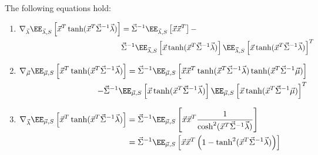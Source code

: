 \begin{lemma}\label{lem:derivatives}
The following equations hold:
\begin{enumerate}	
 \item
 $\begin{aligned}[t]
	\nabla_{\vec{\lambda}} \EE_{\vec{\lambda},S}\left[\vec{x}^T\tanh(\vec{x}^T\vec{\Sigma}^{-1}\vec{\lambda})\right]&=\vec{\Sigma}^{-1}\EE_{\vec{\lambda},S}\left[\vec{x}\vec{x}^T\right]-\\
	&\vec{\Sigma}^{-1}\EE_{\vec{\lambda},S}\left[\vec{x}\tanh(\vec{x}^T\vec{\Sigma}^{-1}\vec{\lambda})\right]\EE_{\vec{\lambda},S}\left[\vec{x}\tanh(\vec{x}^T\vec{\Sigma}^{-1}\vec{\lambda})\right]^T
\end{aligned}$

\item
$\begin{aligned}[t]
	\nabla_{\vec{\mu}} \EE_{\vec{\mu},S}\left[\vec{x}^T\tanh(\vec{x}^T\vec{\Sigma}^{-1}\vec{\lambda})\right]=\vec{\Sigma}^{-1}\EE_{\vec{\mu},S}\left[\vec{x}\vec{x}^T\tanh(\vec{x}^T\vec{\Sigma}^{-1}\vec{\lambda})\tanh(\vec{x}^T\vec{\Sigma}^{-1}\vec{\mu})\right]\\
	\hspace{1in}-\vec{\Sigma}^{-1}\EE_{\vec{\mu},S}\left[\vec{x}\tanh(\vec{x}^T\vec{\Sigma}^{-1}\vec{\lambda})\right]\EE_{\vec{\mu},S}\left[\vec{x}\tanh(\vec{x}^T\vec{\Sigma}^{-1}\vec{\mu})\right]^T
\end{aligned}$

\item $\begin{aligned}[t]
	\nabla_{\vec{\lambda}} \EE_{\vec{\mu},S}\left[\vec{x}^T\tanh(\vec{x}^T\vec{\Sigma}^{-1}\vec{\lambda})\right]&=\vec{\Sigma}^{-1}\EE_{\vec{\mu},S}\left[\vec{x}\vec{x}^T\frac{1}{\cosh^2(\vec{x}^T\vec{\Sigma}^{-1}\vec{\lambda})}\right]\\
	&=\vec{\Sigma}^{-1}\EE_{\vec{\mu},S}\left[\vec{x}\vec{x}^T\left(1-\tanh^2(\vec{x}^T\vec{\Sigma}^{-1}\vec{\lambda})\right)\right]
\end{aligned}$

\end{enumerate}
\end{lemma}



